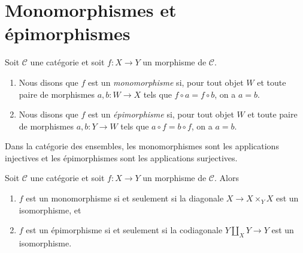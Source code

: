 \section{Monomorphismes et épimorphismes}
\label{section-mono-epi}

\begin{definition}
\label{definition-mono-epi}
Soit $\mathcal{C}$ une catégorie et soit $f : X \to Y$
un morphisme de $\mathcal{C}$.
\begin{enumerate}
\item Nous disons que $f$ est un {\it monomorphisme} si, pour tout objet
$W$ et toute paire de morphismes $a, b : W \to X$ tels que
$f \circ a = f \circ b$, on a $a = b$.
\item Nous disons que $f$ est un {\it épimorphisme} si, pour tout objet
$W$ et toute paire de morphismes $a, b : Y \to W$ tels que
$a \circ f = b \circ f$, on a $a = b$.
\end{enumerate}
\end{definition}

\begin{example}
\label{example-mono-epi-sets}
Dans la catégorie des ensembles, les monomorphismes sont les applications
injectives et les épimorphismes sont les applications surjectives.
\end{example}

\begin{lemma}
\label{lemma-characterize-mono-epi}
Soit $\mathcal{C}$ une catégorie et soit $f : X \to Y$
un morphisme de $\mathcal{C}$. Alors
\begin{enumerate}
\item $f$ est un monomorphisme si et seulement si la diagonale
$X \to X \times_Y X$ est un isomorphisme, et
\item $f$ est un épimorphisme si et seulement si la codiagonale
$Y \amalg_X Y \to Y$ est un isomorphisme.
\end{enumerate}
\end{lemma}

